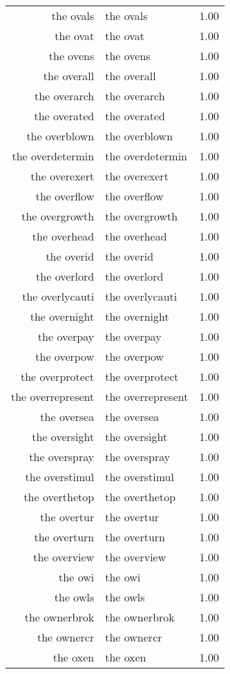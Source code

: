 \begin{table}[ht]
\begin{tabular}{rlr}
  the ovals & the ovals & 1.00 \\ 
  the ovat & the ovat & 1.00 \\ 
  the ovens & the ovens & 1.00 \\ 
  the overall & the overall & 1.00 \\ 
  the overarch & the overarch & 1.00 \\ 
  the overated & the overated & 1.00 \\ 
  the overblown & the overblown & 1.00 \\ 
  the overdetermin & the overdetermin & 1.00 \\ 
  the overexert & the overexert & 1.00 \\ 
  the overflow & the overflow & 1.00 \\ 
  the overgrowth & the overgrowth & 1.00 \\ 
  the overhead & the overhead & 1.00 \\ 
  the overid & the overid & 1.00 \\ 
  the overlord & the overlord & 1.00 \\ 
  the overlycauti & the overlycauti & 1.00 \\ 
  the overnight & the overnight & 1.00 \\ 
  the overpay & the overpay & 1.00 \\ 
  the overpow & the overpow & 1.00 \\ 
  the overprotect & the overprotect & 1.00 \\ 
  the overrepresent & the overrepresent & 1.00 \\ 
  the oversea & the oversea & 1.00 \\ 
  the oversight & the oversight & 1.00 \\ 
  the overspray & the overspray & 1.00 \\ 
  the overstimul & the overstimul & 1.00 \\ 
  the overthetop & the overthetop & 1.00 \\ 
  the overtur & the overtur & 1.00 \\ 
  the overturn & the overturn & 1.00 \\ 
  the overview & the overview & 1.00 \\ 
  the owi & the owi & 1.00 \\ 
  the owls & the owls & 1.00 \\ 
  the ownerbrok & the ownerbrok & 1.00 \\ 
  the ownercr & the ownercr & 1.00 \\ 
  the oxen & the oxen & 1.00 \\ 

\end{tabular}
\end{table}

